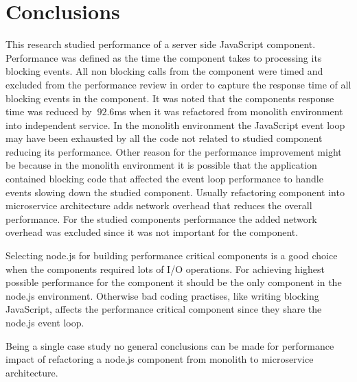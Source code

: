 \chapter{Conclusions\label{conclusions}}
This research studied performance of a server side JavaScript component.
Performance was defined as the time the component takes to processing its blocking events.
All non blocking calls from the component were timed and excluded from the performance review in order to capture the response time of all blocking events in the component.
It was noted that the components response time was reduced by $~92.6$ms when it was refactored from monolith environment into independent service.
In the monolith environment the JavaScript event loop may have been exhausted by all the code not related to studied component reducing its performance.
Other reason for the performance improvement might be because in the monolith environment it is possible that the application contained blocking code that affected the event loop performance to handle events slowing down the studied component.
Usually refactoring component into microservice architecture adds network overhead that reduces the overall performance.
For the studied components performance the added network overhead was excluded since it was not important for the component.

Selecting node.js for building performance critical components is a good choice when the components required lots of I/O operations.
For achieving highest possible performance for the component it should be the only component in the node.js environment.
Otherwise bad coding practises, like writing blocking JavaScript, affects the performance critical component since they share the node.js event loop.

Being a single case study no general conclusions can be made for performance impact of refactoring a node.js component from monolith to microservice architecture.